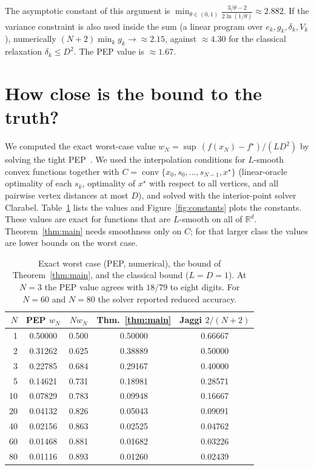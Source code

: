 \documentclass[11pt]{article}
\theoremstyle{remark}
\newcommand{\R}{\mathbb{R}}
\begin{document}
The asymptotic constant of this argument is
$\min_{\theta\in(0,1)}\frac{3/\theta-2}{2\ln(1/\theta)}\approx2.882$. If the
variance constraint is also used inside the sum (a linear program over
$e_k,g_k,\delta_k,V_k$), numerically $(N+2)\min_kg_k\to\approx2.15$, against
$\approx4.30$ for the classical relaxation $\delta_k\le D^2$. The PEP value is
$\approx1.67$.

\section{How close is the bound to the truth?}\label{sec:numerics}

We computed the exact worst-case value $w_N=\sup\,(f(x_N)-f^\star)/(LD^2)$ by solving
the tight PEP~\cite{THG17}. We used the interpolation conditions for $L$-smooth
convex functions together with $C=\operatorname{conv}\{x_0,s_0,\dots,s_{N-1},x^\star\}$
(linear-oracle optimality of each $s_k$, optimality of $x^\star$ with respect to all
vertices, and all pairwise vertex distances at most $D$), and solved with the
interior-point solver Clarabel. Table~\ref{tab:pep} lists the values and
Figure~\ref{fig:constants} plots the constants. These values are exact for
functions that are $L$-smooth on all of $\R^d$. Theorem~\ref{thm:main} needs
smoothness only on $C$; for that larger class the values are lower bounds on the
worst case.

\begin{table}[htbp]
\centering
\begin{tabular}{rcccc}
\toprule
$N$ & PEP $w_N$ & $Nw_N$ & Thm.~\ref{thm:main} & Jaggi $2/(N+2)$\\
\midrule
 1 & 0.50000 & 0.500 & 0.50000 & 0.66667\\
 2 & 0.31262 & 0.625 & 0.38889 & 0.50000\\
 3 & 0.22785 & 0.684 & 0.29167 & 0.40000\\
 5 & 0.14621 & 0.731 & 0.18981 & 0.28571\\
10 & 0.07829 & 0.783 & 0.09948 & 0.16667\\
20 & 0.04132 & 0.826 & 0.05043 & 0.09091\\
40 & 0.02156 & 0.863 & 0.02525 & 0.04762\\
60 & 0.01468 & 0.881 & 0.01682 & 0.03226\\
80 & 0.01116 & 0.893 & 0.01260 & 0.02439\\
\bottomrule
\end{tabular}
\caption{Exact worst case (PEP, numerical), the bound of Theorem~\ref{thm:main},
and the classical bound ($L=D=1$). At $N=3$ the PEP value agrees with $18/79$ to
eight digits. For $N=60$ and $N=80$ the solver reported reduced accuracy.}
\label{tab:pep}
\end{table}
\end{document}
